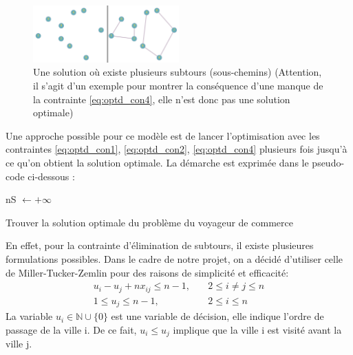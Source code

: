 \documentclass{article}
\begin{document}
\begin{figure}[h]\centering
\includegraphics[width=0.5\textwidth]{graphe_avec_subtour}
\caption{Une solution où existe plusieurs subtours (sous-chemins) (Attention, il s'agit d'un exemple pour montrer la conséquence d'une manque de la contrainte \ref{eq:optd_con4}, elle n'est donc pas une solution optimale)}

\end{figure}
Une approche possible pour ce modèle est de lancer l'optimisation avec les contraintes \ref{eq:optd_con1}, \ref{eq:optd_con2}, \ref{eq:optd_con4} plusieurs fois jusqu'à ce qu'on obtient la solution optimale. La démarche est exprimée dans le pseudo-code ci-dessous :\\
\begin{algorithm}[H] 
   nS \(\leftarrow +\infty\)  \;
 \caption{Trouver la solution optimale du problème du voyageur de commerce}
\end{algorithm}
En effet, pour la contrainte d'élimination de subtours, il existe plusieures formulations possibles. Dans le cadre de notre projet, on a décidé d'utiliser celle de Miller-Tucker-Zemlin pour des raisons de simplicité et efficacité:
\begin{equation}
\begin{aligned}
	u_i - u_j + nx_{ij} \leq n - 1, \quad & 2 \leq i \neq j \leq n \\
	1 \leq u_j \leq n - 1, \quad & 2 \leq i \leq n
\end{aligned}
\end{equation}
La variable \(u_i \in \mathbb{N} \cup \{0\}\) est une variable de décision, elle indique l'ordre de passage de la ville i. De ce fait, \(u_i \leq u_j\) implique que la ville i est visité avant la ville j.
\end{document}
